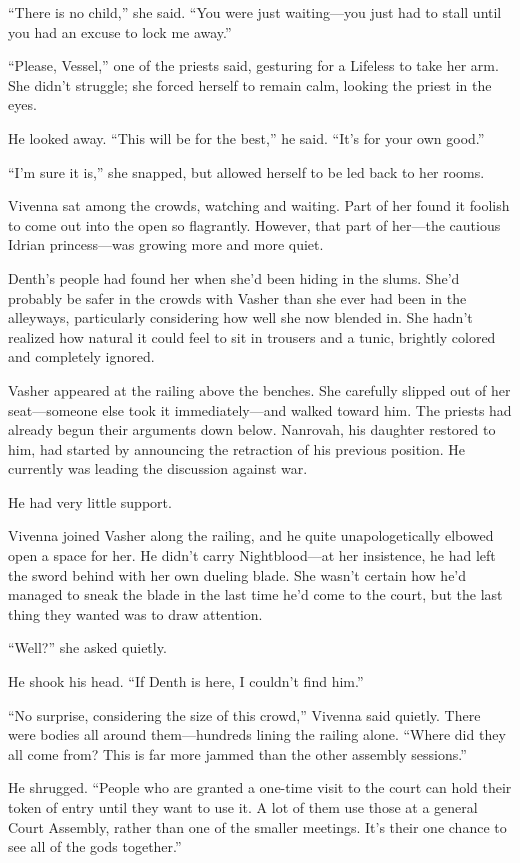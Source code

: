 “There is no child,” she said. “You were just waiting—you just had to stall until you had an excuse to lock me away.”

“Please, Vessel,” one of the priests said, gesturing for a Lifeless to take her arm. She didn’t struggle; she forced herself to remain calm, looking the priest in the eyes.

He looked away. “This will be for the best,” he said. “It’s for your own good.”

“I’m sure it is,” she snapped, but allowed herself to be led back to her rooms.

\orn

Vivenna sat among the crowds, watching and waiting. Part of her found it foolish to come out into the open so flagrantly. However, that part of her—the cautious Idrian princess—was growing more and more quiet.

Denth’s people had found her when she’d been hiding in the slums. She’d probably be safer in the crowds with Vasher than she ever had been in the alleyways, particularly considering how well she now blended in. She hadn’t realized how natural it could feel to sit in trousers and a tunic, brightly colored and completely ignored.

Vasher appeared at the railing above the benches. She carefully slipped out of her seat—someone else took it immediately—and walked toward him. The priests had already begun their arguments down below. Nanrovah, his daughter restored to him, had started by announcing the retraction of his previous position. He currently was leading the discussion against war.

He had very little support.

Vivenna joined Vasher along the railing, and he quite unapologetically elbowed open a space for her. He didn’t carry Nightblood—at her insistence, he had left the sword behind with her own dueling blade. She wasn’t certain how he’d managed to sneak the blade in the last time he’d come to the court, but the last thing they wanted was to draw attention.

“Well?” she asked quietly.

He shook his head. “If Denth is here, I couldn’t find him.”

“No surprise, considering the size of this crowd,” Vivenna said quietly. There were bodies all around them—hundreds lining the railing alone. “Where did they all come from? This is far more jammed than the other assembly sessions.”

He shrugged. “People who are granted a one-time visit to the court can hold their token of entry until they want to use it. A lot of them use those at a general Court Assembly, rather than one of the smaller meetings. It’s their one chance to see all of the gods together.”

